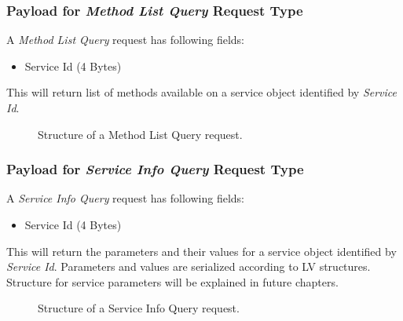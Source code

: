 \documentclass[10pt,a4paper]{article}
\begin{document}
\subsubsection {Payload for \textit{Method List Query} Request Type}
A \textit{Method List Query} request has following fields:
\begin{itemize}
  \item Service Id (4 Bytes)
\end{itemize}
This will return list of methods available on a service object identified by \textit{Service Id}.

\begin{figure}[!ht]
  \caption{Structure of a Method List Query request.}
  \centering
\end{figure}

\subsubsection {Payload for \textit{Service Info Query} Request Type}
A \textit{Service Info Query} request has following fields:
\begin{itemize}
  \item Service Id (4 Bytes)
\end{itemize}
This will return the parameters and their values for a service object identified by \textit{Service Id}. Parameters and values are serialized according to LV structures. Structure for service parameters will be explained in future chapters.

\begin{figure}[!ht]
  \caption{Structure of a Service Info Query request.}
  \centering
\end{figure}
\end{document}
